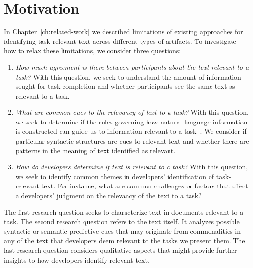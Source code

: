 \section{Motivation}
\label{cp3:method}



In Chapter~\ref{ch:related-work} we described limitations 
of existing approaches for identifying task-relevant 
text across different types of artifacts. 
To investigate how to relax these limitations, we consider three questions:


\begin{enumerate}[label=\textit{RQ\arabic*},leftmargin=*]

    \item \textit{How much agreement is there between participants about the text
    relevant to a task?} With this question, we seek to understand
    the amount of information sought for task completion
    and whether participants see the same text as
    relevant to a task.

    \item \textit{What are common cues to the relevancy of text to a task?}
    With this question, we seek to determine if the rules governing how natural language information
    is constructed can guide us to information relevant to a task~\cite{Kintsch1978a}.
    We consider if  particular  syntactic structures are cues to relevant text and whether there
    are patterns in the meaning of text identified as relevant.

    \item \textit{How do developers determine if text is relevant to a task?}
    With this question, we seek to identify common themes in developers' identification of task-relevant text. For instance, what are common challenges or factors that affect a developers' judgment on the relevancy of the text to a task?

\end{enumerate}



The first research question seeks to characterize text
in documents relevant to a task.
The second research question refers to the text itself.
It analyzes possible syntactic or semantic
predictive cues that may originate from commonalities in any of the text that developers deem relevant to the tasks we present them.
The last research question considers qualitative aspects that might provide
further insights to how developers identify relevant text.

